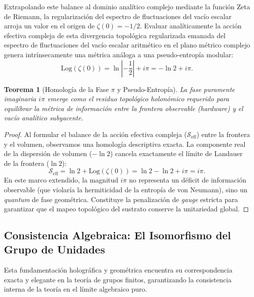 \documentclass[12pt,a4paper]{article}
\theoremstyle{plain}
\newtheorem{teorema}{Teorema}[section]
\theoremstyle{definition}
\theoremstyle{remark}
\begin{document}
Extrapolando este balance al dominio analítico complejo mediante la función Zeta de Riemann, la regularización del espectro de fluctuaciones del vacío escalar arroja un valor en el origen de $\zeta(0) = -1/2$. Evaluar analíticamente la acción efectiva compleja de esta divergencia topológica regularizada emanada del espectro de fluctuaciones del vacío escalar aritmético \cite{Peinador_Vacuum_Alpha_2025} en el plano métrico complejo genera intrínsecamente una métrica análoga a una pseudo-entropía modular:
\begin{equation}
    \text{Log}(\zeta(0)) = \ln\left|-\frac{1}{2}\right| + i\pi = -\ln 2 + i\pi.
\end{equation}

\begin{teorema}[Homología de la Fase $\pi$ y Pseudo-Entropía]
La fase puramente imaginaria $i\pi$ emerge como el residuo topológico holonómico requerido para equilibrar la métrica de información entre la frontera observable (hardware) y el vacío analítico subyacente.
\end{teorema}
\begin{proof}
Al formular el balance de la acción efectiva compleja ($\mathcal{S}_{\text{eff}}$) entre la frontera y el volumen, observamos una homología descriptiva exacta. La componente real de la dispersión de volumen ($-\ln 2$) cancela exactamente el límite de Landauer de la frontera ($\ln 2$):
\begin{equation}
    \mathcal{S}_{\text{eff}} = \ln 2 + \text{Log}(\zeta(0)) = \ln 2 - \ln 2 + i\pi = i\pi.
\end{equation}
En este marco extendido, la magnitud $i\pi$ no representa un déficit de información observable (que violaría la hermiticidad de la entropía de von Neumann), sino un \textit{quantum} de fase geométrica. Constituye la penalización de \textit{gauge} estricta para garantizar que el mapeo topológico del sustrato conserve la unitariedad global.
\end{proof}

\subsection{Consistencia Algebraica: El Isomorfismo del Grupo de Unidades}
\label{subsec:isomorfismo_unidades}

Esta fundamentación holográfica y geométrica encuentra su correspondencia exacta y elegante en la teoría de grupos finitos, garantizando la consistencia interna de la teoría en el límite algebraico puro.
\end{document}

